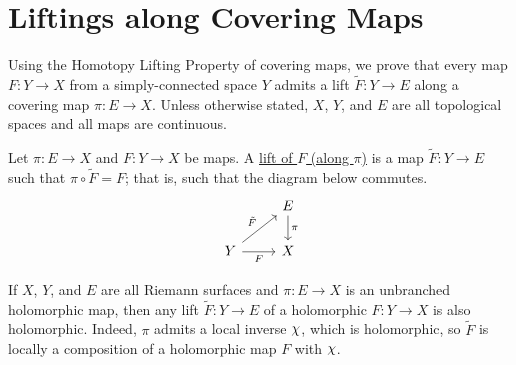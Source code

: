 \documentclass[../Moduli_Spaces_of_Riemann_Surfaces.tex]{subfiles}
\begin{document}
    \section{Liftings along Covering Maps}\label{CS:sec:liftings_of_maps}
    Using the Homotopy Lifting Property of covering maps, we prove that every map $F:Y\to X$ from a simply-connected space $Y$ admits a lift $\widetilde{F}:Y\to E$ along a covering map $\pi:E\to X$. Unless otherwise stated, $X$, $Y$, and $E$ are all topological spaces and all maps are continuous.
    \begin{definition}
        Let $\pi:E\to X$ and $F:Y\to X$ be maps. A \ul{lift of $F$ (along $\pi$)} is a map $\widetilde{F}:Y\to E$ such that $\pi\circ\widetilde{F}=F$; that is, such that the diagram below commutes.
        \begin{equation*}
            \begin{tikzcd}
                & E \ar[d, "\pi"] \\
                Y \ar[ur, "\tilde{F}"] \ar[r, "F"'] & X
            \end{tikzcd}
        \end{equation*}
    \end{definition}
    \begin{remark}
        If $X$, $Y$, and $E$ are all Riemann surfaces and $\pi:E\to X$ is an unbranched holomorphic map, then any lift $\widetilde{F}:Y\to E$ of a holomorphic $F:Y\to X$ is also holomorphic. Indeed, $\pi$ admits a local inverse $\cchi$, which is holomorphic, so $\widetilde{F}$ is locally a composition of a holomorphic map $F$ with $\cchi$.\exqed
    \end{remark}
\end{document}
